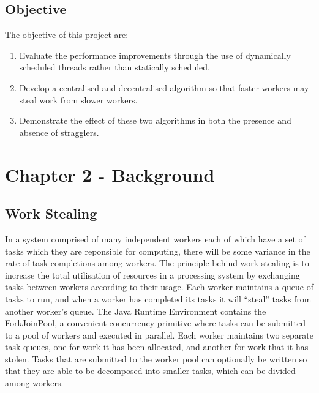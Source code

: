 \documentclass[12pt]{article}
\begin{document}
\newpage

\subsection{Objective}
The objective of this project are:

\begin{enumerate}
\item Evaluate the performance improvements through the use of dynamically scheduled threads rather than statically scheduled.
\item Develop a centralised and decentralised algorithm so that faster workers may steal work from slower workers.
\item Demonstrate the effect of these two algorithms in both the presence and absence of stragglers.
\end{enumerate}

\newpage

\section{Chapter 2 - Background}

\subsection{Work Stealing}

In a system comprised of many independent workers each of which have a set of tasks which they are reponsible for computing, there will be some variance in the rate of task completions among workers.
\newline
\newline
The principle behind work stealing is to increase the total utilisation of resources in a processing system by exchanging tasks between workers according to their usage. Each worker maintains a queue of tasks to run, and when a worker has completed its tasks it will ``steal'' tasks from another worker's queue.
\newline
\newline
The Java Runtime Environment contains the ForkJoinPool\cite{javaThreads}, a convenient concurrency primitive where tasks can be submitted to a pool of workers and executed in parallel. Each worker maintains two separate task queues, one for work it has been allocated, and another for work that it has stolen. Tasks that are submitted to the worker pool can optionally be written so that they are able to be decomposed into smaller tasks, which can be divided among workers.
\newline
\end{document}
